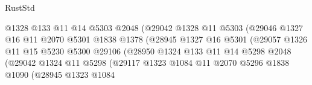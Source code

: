 \begin{lexlean}{RustStd}
\begin{coremodule}
                                      @1328
                                      @133
                                      @11
                                      @14
                                      @5303
                                      @2048
                                      (@29042
                                        @1328
                                        @11
                                        @5303
                                        (@29046
                                          @1327
                                          @16
                                          @11
                                          @2070
                                          @5301
                                          @1838
                                          @1378
                                          (@28945
                                            @1327
                                            @16
                                            @5301
                                            (@29057
                                              @1326
                                              @11
                                              @15
                                              @5230
                                              @5300
                                              @29106
                                              (@28950
                                                @1324
                                                @133
                                                @11
                                                @14
                                                @5298
                                                @2048
                                                (@29042
                                                  @1324
                                                  @11
                                                  @5298
                                                  (@29117
                                                    @1323
                                                    @1084
                                                    @11
                                                    @2070
                                                    @5296
                                                    @1838
                                                    @1090
                                                    (@28945
                                                      @1323
                                                      @1084

\end{coremodule}
\end{lexlean}
